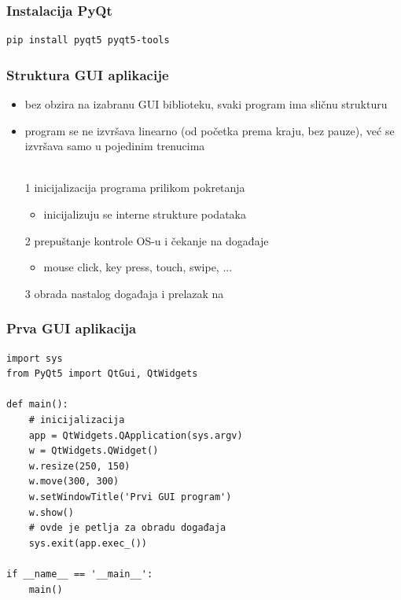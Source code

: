 \documentclass[utf8,compress]{beamer}
\begin{document}
\begin{frame}[fragile]
  \frametitle{Instalacija PyQt}
\begin{verbatim}
pip install pyqt5 pyqt5-tools
\end{verbatim}
\end{frame}

\begin{frame}[fragile]
  \frametitle{Struktura GUI aplikacije}
  \begin{itemize}
    \item bez obzira na izabranu GUI biblioteku, svaki program ima sličnu strukturu
    \item program se ne izvršava linearno (od početka prema kraju, bez pauze), već se izvršava samo u pojedinim trenucima \\ \ \\
    \item[1] inicijalizacija programa prilikom pokretanja 
    \begin{itemize}
      \item inicijalizuju se interne strukture podataka
    \end{itemize}
    \item[2] prepuštanje kontrole OS-u i čekanje na događaje
    \begin{itemize}
      \item mouse click, key press, touch, swipe, ...
    \end{itemize}
    \item[3] obrada nastalog događaja i prelazak na 
  \end{itemize}
\end{frame}

\begin{frame}[fragile]
  \frametitle{Prva GUI aplikacija}
\begin{verbatim}
import sys
from PyQt5 import QtGui, QtWidgets

def main():
    # inicijalizacija
    app = QtWidgets.QApplication(sys.argv)
    w = QtWidgets.QWidget()
    w.resize(250, 150)
    w.move(300, 300)
    w.setWindowTitle('Prvi GUI program')
    w.show()
    # ovde je petlja za obradu događaja
    sys.exit(app.exec_())

if __name__ == '__main__':
    main()
\end{verbatim}
\end{frame}
\end{document}

